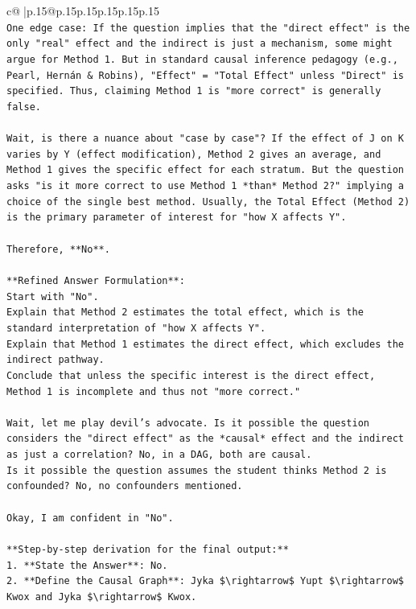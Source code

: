 \documentclass{article}
\begin{document}
{\begin{supertabular}{c@{$\;$}|p{.15\linewidth}@{}p{.15\linewidth}p{.15\linewidth}p{.15\linewidth}p{.15\linewidth}p{.15\linewidth}}
{{{\\ 
\texttt{One edge case: If the question implies that the "direct effect" is the only "real" effect and the indirect is just a mechanism, some might argue for Method 1. But in standard causal inference pedagogy (e.g., Pearl, Hernán \& Robins), "Effect" = "Total Effect" unless "Direct" is specified. Thus, claiming Method 1 is "more correct" is generally false.} \\
\\ 
\texttt{Wait, is there a nuance about "case by case"? If the effect of J on K varies by Y (effect modification), Method 2 gives an average, and Method 1 gives the specific effect for each stratum. But the question asks "is it more correct to use Method 1 *than* Method 2?" implying a choice of the single best method. Usually, the Total Effect (Method 2) is the primary parameter of interest for "how X affects Y".} \\
\\ 
\texttt{Therefore, **No**.} \\
\\ 
\texttt{**Refined Answer Formulation**:} \\
\texttt{Start with "No".} \\
\texttt{Explain that Method 2 estimates the total effect, which is the standard interpretation of "how X affects Y".} \\
\texttt{Explain that Method 1 estimates the direct effect, which excludes the indirect pathway.} \\
\texttt{Conclude that unless the specific interest is the direct effect, Method 1 is incomplete and thus not "more correct."} \\
\\ 
\texttt{Wait, let me play devil's advocate. Is it possible the question considers the "direct effect" as the *causal* effect and the indirect as just a correlation? No, in a DAG, both are causal.} \\
\texttt{Is it possible the question assumes the student thinks Method 2 is confounded? No, no confounders mentioned.} \\
\\ 
\texttt{Okay, I am confident in "No".} \\
\\ 
\texttt{**Step{-}by{-}step derivation for the final output:**} \\
\texttt{1.  **State the Answer**: No.} \\
\texttt{2.  **Define the Causal Graph**: Jyka \$\textbackslash{}rightarrow\$ Yupt \$\textbackslash{}rightarrow\$ Kwox and Jyka \$\textbackslash{}rightarrow\$ Kwox.} \\
}}}
\end{supertabular}}
\end{document}
